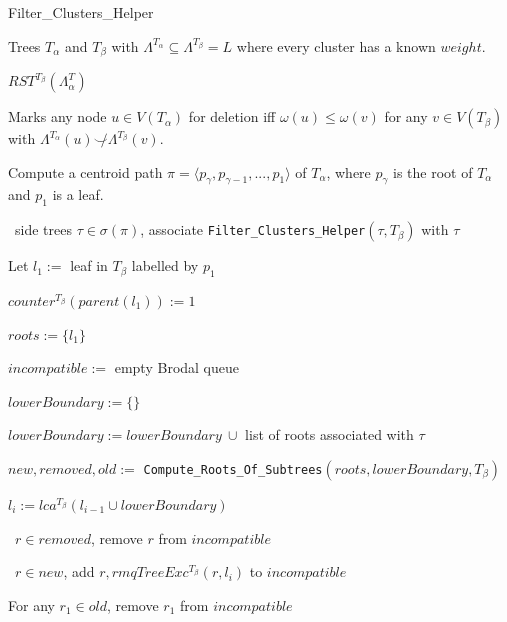 \documentclass{article}
\newcommand{\compatible}{\smile}
\newcommand{\leafset}{\Lambda}
\newcommand{\weight}{\omega}
\newcommand{\TA}{T_\alpha}
\newcommand{\TB}{T_\beta}
\begin{document}
    \begin{algorithm}[ht]
        \caption{Filter\_Clusters\_Helper}
        \label{alg:filterclustershelper}

        \begin{algorithmic}[1]
            \Input Trees $\TA$ and $\TB$ with $\leafset^{\TA} \subseteq \leafset^{\TB} = L$ where every cluster has a known $weight$.

            \Output $RST^{\TB}(\leafset^\TA)$

            \SideEffect Marks any node $u \in V(\TA)$ for deletion iff $\weight(u) \leq \weight(v)$ for any $v \in V(\TB)$ with $\leafset^{\TA}(u) \not\compatible \leafset^{\TB}(v)$.

            \State Compute a centroid path $\pi = \langle p_{\gamma}, p_{\gamma - 1}, ..., p_1 \rangle$ of $\TA$, where $p_{\gamma}$ is the root of $\TA$ and $p_1$ is a leaf.

            \State \algorithmicforall\ side trees $\tau \in \sigma(\pi)$,
                associate \texttt{Filter\_Clusters\_Helper}$(\tau, \TB)$ with $\tau$

            \State Let $l_1 :=$ leaf in $\TB$ labelled by $p_1$

            \State $counter^{\TB}(parent(l_1)) := 1$

            \State $roots := \{l_1\}$

            \State $incompatible :=$ empty Brodal queue

                \State $lowerBoundary := \{\}$

                    \State $lowerBoundary := lowerBoundary\ \cup$ list of roots associated with $\tau$
                \EndFor

                \State $new, removed, old :=$ \texttt{Compute\_Roots\_Of\_Subtrees}$(roots, lowerBoundary, \TB)$

                \State $l_i := lca^{\TB}(l_{i-1} \cup lowerBoundary)$

                \State \algorithmicforall\ $r \in removed$, remove $r$ from $incompatible$
                \label{step:removedrootsremoval}

                \State \algorithmicforall\ $r \in new$, add $r, rmqTreeExc^{\TB}(r, l_i)$ to $incompatible$

                    \State For any $r_1 \in old$, remove $r_1$ from $incompatible$
                    \label{step:oldrootremoval}


\end{algorithmic}
\end{algorithm}
\end{document}

